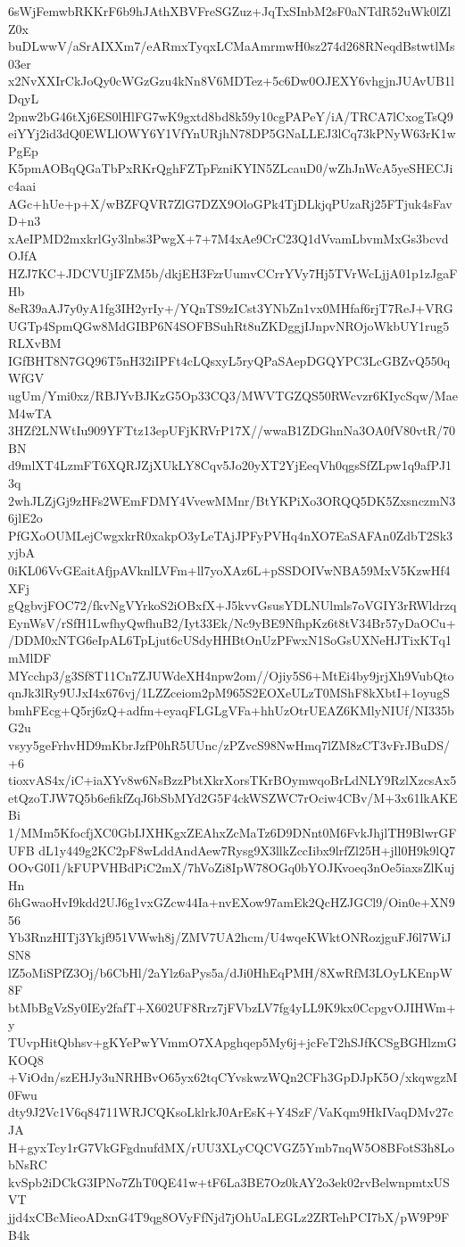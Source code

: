 6sWjFemwbRKKrF6b9hJAthXBVFreSGZuz+JqTxSInbM2sF0aNTdR52uWk0lZlZ0x
buDLwwV/aSrAIXXm7/eARmxTyqxLCMaAmrmwH0sz274d268RNeqdBstwtlMs03er
x2NvXXIrCkJoQy0cWGzGzu4kNn8V6MDTez+5c6Dw0OJEXY6vhgjnJUAvUB1lDqyL
2pnw2bG46tXj6ES0lHlFG7wK9gxtd8bd8k59y10cgPAPeY/iA/TRCA7lCxogTsQ9
eiYYj2id3dQ0EWLlOWY6Y1VfYnURjhN78DP5GNaLLEJ3lCq73kPNyW63rK1wPgEp
K5pmAOBqQGaTbPxRKrQghFZTpFzniKYIN5ZLcauD0/wZhJnWcA5yeSHECJic4aai
AGc+hUe+p+X/wBZFQVR7ZlG7DZX9OloGPk4TjDLkjqPUzaRj25FTjuk4sFavD+n3
xAeIPMD2mxkrlGy3lnbs3PwgX+7+7M4xAe9CrC23Q1dVvamLbvmMxGs3bcvdOJfA
HZJ7KC+JDCVUjIFZM5b/dkjEH3FzrUumvCCrrYVy7Hj5TVrWcLjjA01p1zJgaFHb
8eR39aAJ7y0yA1fg3IH2yrIy+/YQnTS9zICst3YNbZn1vx0MHfaf6rjT7ReJ+VRG
UGTp4SpmQGw8MdGIBP6N4SOFBSuhRt8uZKDggjIJnpvNROjoWkbUY1rug5RLXvBM
IGfBHT8N7GQ96T5nH32iIPFt4cLQsxyL5ryQPaSAepDGQYPC3LcGBZvQ550qWfGV
ugUm/Ymi0xz/RBJYvBJKzG5Op33CQ3/MWVTGZQS50RWcvzr6KIycSqw/MaeM4wTA
3HZf2LNWtIu909YFTtz13epUFjKRVrP17X//wwaB1ZDGhnNa3OA0fV80vtR/70BN
d9mlXT4LzmFT6XQRJZjXUkLY8Cqv5Jo20yXT2YjEeqVh0qgsSfZLpw1q9afPJ13q
2whJLZjGj9zHFs2WEmFDMY4VvewMMnr/BtYKPiXo3ORQQ5DK5ZxsnczmN36jlE2o
PfGXoOUMLejCwgxkrR0xakpO3yLeTAjJPFyPVHq4nXO7EaSAFAn0ZdbT2Sk3yjbA
0iKL06VvGEaitAfjpAVknlLVFm+ll7yoXAz6L+pSSDOIVwNBA59MxV5KzwHf4XFj
gQgbvjFOC72/fkvNgVYrkoS2iOBxfX+J5kvvGsusYDLNUlmls7oVGIY3rRWldrzq
EynWsV/rSfH1LwfhyQwfhuB2/Iyt33Ek/Nc9yBE9NfhpKz6t8tV34Br57yDaOCu+
/DDM0xNTG6eIpAL6TpLjut6cUSdyHHBtOnUzPFwxN1SoGsUXNeHJTixKTq1mMlDF
MYcchp3/g3Sf8T11Cn7ZJUWdeXH4npw2om//Ojiy5S6+MtEi4by9jrjXh9VubQto
qnJk3lRy9UJxI4x676vj/1LZZceiom2pM965S2EOXeULzT0MShF8kXbtI+1oyugS
bmhFEcg+Q5rj6zQ+adfm+eyaqFLGLgVFa+hhUzOtrUEAZ6KMlyNIUf/NI335bG2u
vsyy5geFrhvHD9mKbrJzfP0hR5UUnc/zPZvcS98NwHmq7lZM8zCT3vFrJBuDS/+6
tioxvAS4x/iC+iaXYv8w6NsBzzPbtXkrXorsTKrBOymwqoBrLdNLY9RzlXzcsAx5
etQzoTJW7Q5b6efikfZqJ6bSbMYd2G5F4ckWSZWC7rOciw4CBv/M+3x61lkAKEBi
1/MMm5KfocfjXC0GbIJXHKgxZEAhxZcMaTz6D9DNnt0M6FvkJhjlTH9BlwrGFUFB
dL1y449g2KC2pF8wLddAndAew7Rysg9X3llkZccIibx9lrfZl25H+jll0H9k9lQ7
OOvG0I1/kFUPVHBdPiC2mX/7hVoZi8IpW78OGq0bYOJKvoeq3nOe5iaxsZlKujHn
6hGwaoHvI9kdd2UJ6g1vxGZcw44Ia+nvEXow97amEk2QcHZJGCl9/Oin0e+XN956
Yb3RnzHITj3Ykjf951VWwh8j/ZMV7UA2hcm/U4wqeKWktONRozjguFJ6l7WiJSN8
lZ5oMiSPfZ3Oj/b6CbHl/2aYlz6aPys5a/dJi0HhEqPMH/8XwRfM3LOyLKEnpW8F
btMbBgVzSy0IEy2fafT+X602UF8Rrz7jFVbzLV7fg4yLL9K9kx0CcpgvOJIHWm+y
TUvpHitQbhsv+gKYePwYVmmO7XApghqep5My6j+jcFeT2hSJfKCSgBGHlzmGKOQ8
+ViOdn/szEHJy3uNRHBvO65yx62tqCYvskwzWQn2CFh3GpDJpK5O/xkqwgzM0Fwu
dty9J2Vc1V6q84711WRJCQKsoLklrkJ0ArEsK+Y4SzF/VaKqm9HkIVaqDMv27cJA
H+gyxTcy1rG7VkGFgdnufdMX/rUU3XLyCQCVGZ5Ymb7nqW5O8BFotS3h8LobNsRC
kvSpb2iDCkG3IPNo7ZhT0QE41w+tF6La3BE7Oz0kAY2o3ek02rvBelwnpmtxUSVT
jjd4xCBcMieoADxnG4T9qg8OVyFfNjd7jOhUaLEGLz2ZRTehPCI7bX/pW9P9FB4k

